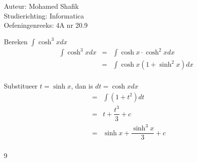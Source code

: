 \documentclass[a4paper]{article}
\begin{document}
\noindent \large Auteur: Mohamed Shafik \\
\noindent \large Studierichting: Informatica\\
\noindent \large Oefeningenreeks: 4A nr 20.9\\

\medskip

\normalsize

Bereken $\displaystyle\int \cosh^3 x dx$\\

\begin{eqnarray*}
\displaystyle\int \cosh^3 x dx &=& \displaystyle\int \cosh x \cdot \cosh^2 x dx\\
&=& \displaystyle\int \cosh x (1 + \sinh^2 x) dx\\
\end{eqnarray*}

Substitueer $t = \sinh x$, dan is $dt = \cosh x dx$\\

\begin{eqnarray*}
&=& \displaystyle\int (1 + t^2) dt\\
&=& t + \dfrac{t^3}{3} + c\\
&=& \sinh x + \dfrac{\sinh^3 x}{3} + c\\
\end{eqnarray*}

\begin{thebibliography}{9}
\end{thebibliography}
\end{document}
